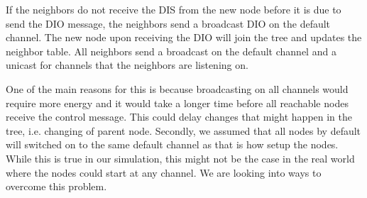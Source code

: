 If the neighbors do not receive the DIS from the new node before it is due to send the DIO message, the neighbors send a broadcast DIO on the default channel. The new node upon receiving the DIO will join the tree and updates the neighbor table. All neighbors send a broadcast on the default channel and a unicast for channels that the neighbors are listening on. 

One of the main reasons for this is because broadcasting on all channels would require more energy and it would take a longer time before all reachable nodes receive the control message. This could delay changes that might happen in the tree, i.e. changing of parent node. Secondly, we assumed that all nodes by default will switched on to the same default channel as that is how setup the nodes. While this is true in our simulation, this might not be the case in the real world where the nodes could start at any channel. We are looking into ways to overcome this problem.

